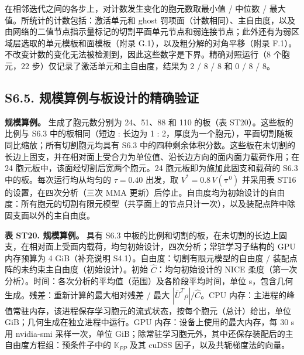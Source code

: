 \documentclass[preprint,12pt,authoryear]{elsarticle}
\begin{document}
在相邻迭代之间的各步上，对计数发生变化的胞元数取最小值 / 中位数 / 最大值。所统计的计数包括：激活单元和 ghost 罚项面（计数相同）、主自由度，以及由网络的二值节点指示量标记的切割平面单元节点和弱连接节点；此外还有为弱区域层选取的单元模板和面模板（附录 G.1），以及粗分解的对角平移（附录 F.1）。不改变计数的变化无法被检测到，因此这些数字是下界。精确对照运行（8 个胞元，22 步）仅记录了激活单元和主自由度，结果为 2 / 8 / 8 和 0 / 8 / 8。

\subsection{S6.5. 规模算例与板设计的精确验证}

\textbf{规模算例。} 生成了胞元数分别为 24、51、88 和 110 的板（表 ST20）。这些板的比例与 S6.3 中的板相同（短边 : 长边为 1 : 2，厚度为一个胞元），平面切割随板同比缩放；所有切割胞元均具有 S6.3 中的四种剩余体积分数。这些板在未切割的长边上固支，并在相对面上受合力为单位值、沿长边方向的面内面力载荷作用；在 24 胞元板中，该面经切割后宽两个胞元。24 胞元板即为施加此固支和载荷的 S6.3 中的板。每次运行均从均匀的 \(\tau=0.40\) 出发，取 \(V^*=0.8\,V(\boldsymbol\tau^0)\) 并采用表 ST16 的设置，在四次分析（三次 MMA 更新）后停止。自由度均为初始设计的自由度：所有胞元的切割有限元模型（共享面上的节点只计一次），以及装配点阵中除固支面以外的主自由度。

\textbf{表 ST20. 规模算例。} 具有 S6.3 中板的比例和切割的板，在未切割的长边上固支，在相对面上受面内载荷，均匀初始设计，四次分析；常驻学习子结构的 GPU 内存预算为 4 GiB（补充说明 S4.1）。自由度：切割有限元模型的自由度 / 装配点阵的未约束主自由度（初始设计）。初始 \(\widehat C\)：均匀初始设计的 NICE 柔度（第一次分析）。时间：各次分析的平均值（范围）及各阶段平均时间，单位 s，包含几何生成。残差：重新计算的最大相对残差 / 最大 \(|\bar U^T\rho|/\widehat C\)。CPU 内存：主进程的峰值常驻内存，该进程保存学习胞元的流式状态，按每个胞元（总计）给出，单位 GiB；几何生成在独立进程中运行。GPU 内存：设备上使用的最大内存，每 30 s 用 nvidia-smi 采样一次，单位 GiB；除常驻学习胞元外，其中还保存装配后的主自由度方程组：预条件子中的 \(\mathbb K_{PP}\) 及其 cuDSS 因子，以及共轭梯度法的向量。
\end{document}
